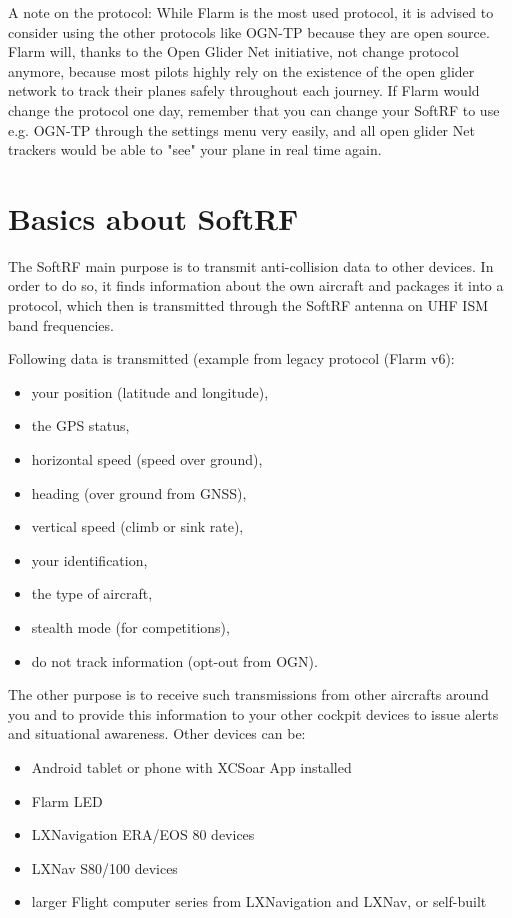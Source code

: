 \documentclass[11pt,a4paper]{article}
\begin{document}
A note on the protocol: While Flarm is the most used protocol, it is advised to consider using the other protocols like OGN-TP because they are open source. Flarm will, thanks to the Open Glider Net initiative, not change protocol anymore, because most pilots highly rely on the existence of the open glider network to track their planes safely throughout each journey. If Flarm would change the protocol one day, remember that you can change your SoftRF to use e.g. OGN-TP through the settings menu very easily, and all open glider Net trackers would be able to "see" your plane in real time again.

\section{Basics about SoftRF}
The SoftRF main purpose is to transmit anti-collision data to other devices. In order to do so, it finds information about the own aircraft and packages it into a protocol, which then is transmitted through the SoftRF antenna on UHF ISM band frequencies.

Following data is transmitted (example from legacy protocol (Flarm v6):
\begin{itemize}
\item your position (latitude and longitude),
\item the GPS status,
\item horizontal speed (speed over ground),
\item heading (over ground from GNSS),
\item vertical speed (climb or sink rate),
\item your identification,
\item the type of aircraft,
\item stealth mode (for competitions),
\item do not track information (opt-out from OGN).
\end{itemize}

The other purpose is to receive such transmissions from other aircrafts around you and to provide this information to your other cockpit devices to issue alerts and situational awareness. Other devices can be:

\begin{itemize}
\item Android tablet or phone with XCSoar App installed
\item Flarm LED
\item LXNavigation ERA/EOS 80 devices
\item LXNav S80/100 devices
\item larger Flight computer series from LXNavigation and LXNav, or self-built
\end{itemize}
\end{document}
